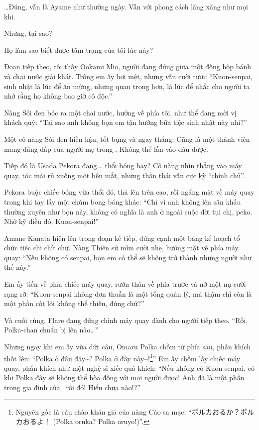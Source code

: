\documentclass[../main.tex]{subfiles}
\begin{document}
\dots Đúng, vẫn là Ayame như thường ngày. Vẫn với phong cách lăng xăng như mọi khi.

Nhưng, tại sao?

Họ làm sao biết được tâm trạng của tôi lúc này?

\ct

Đoạn tiếp theo, tôi thấy Ookami Mio, người đang đứng giữa một đống hộp bánh và chai nước giải khát. Trông em ấy hơi mệt, nhưng vẫn cười tươi: ``Kuon-senpai, sinh nhật là lúc để ăn mừng, nhưng quan trọng hơn, là lúc để nhắc cho người ta nhớ rằng họ không bao giờ cô độc.''

Nàng Sói đen bóc ra một chai nước, hướng về phía tôi, như thể đang mời vị khách quý: ``Tại sao anh không bọn em tận hưởng bữa tiệc sinh nhật này nhỉ?''

Một cô nàng Sói đen hiền hậu, tốt bụng và ngay thẳng. Cũng là một thành viên mang dáng dấp của người mẹ trong \hll. Không thể lẫn vào đâu được.

\ct

Tiếp đó là Usada Pekora đang\dots\ thổi bóng bay? Cô nàng nhìn thẳng vào máy quay, tóc mái rủ xuống một bên mắt, nhưng thần thái vẫn cực kỳ ``chính chủ''.

Pekora buộc chiếc bóng vừa thổi đó, thả lên trên cao, rồi ngẩng mặt về máy quay trong khi tay lấy một chùm bong bóng khác: ``Chỉ vì anh không lên sân khấu thường xuyên như bọn này, không có nghĩa là anh ở ngoài cuộc đời tụi chị, peko. Nhớ kỹ điều đó, Kuon-senpai!''

\ct

Amane Kanata hiện lên trong đoạn kế tiếp, đứng cạnh một bảng kế hoạch tổ chức tiệc chi chít chữ. Nàng Thiên sứ mỉm cười nhẹ, hướng mặt về phía máy quay: ``Nếu không có senpai, bọn em có thể sẽ không trở thành những người như thế này.''

Em ấy tiến về phía chiếc máy quay, rướn thân về phía trước và nở một nụ cười rạng rỡ: ``Kuon-senpai không đơn thuần là một tổng quản lý, mà thậm chí còn là một phần cốt lõi không thể thiếu, đúng chứ?''

\ct

Và cuối cùng, Flare đang đứng chỉnh máy quay dành cho người tiếp theo. ``Rồi, Polka-chan chuẩn bị lên nào\dots''

Nhưng ngay khi em ấy vừa dứt câu, Omaru Polka chồm từ phía sau, phấn khích thốt lên: ``Polka ở đâu đây\~{}? Polka ở đây này\~{}!\footnote{Nguyên gốc là câu chào khán giả của nàng Cáo sa mạc: ``ポルカおるか？ポルカおるよ！ (Polka oruka? Polka oruyo!)''.}'' Em ấy chồm lấy chiếc máy quay, phấn khích như một nghệ sĩ xiếc quá khích: ``Nếu không có Kuon-senpai, có khi Polka đây sẽ không thể hòa đồng với mọi người được! Anh đã là một phần trong gia đình của \hll\ rồi đó! Hiểu chưa nào!?''
\end{document}
